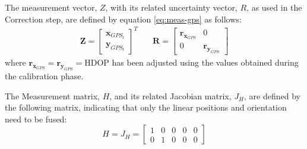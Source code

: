 The measurement vector, $Z$, with its related uncertainty vector, $R$, as used in the Correction step, are defined by equation \eqref{eq:meas-gps} as follows:  
\begin{align}
\label{eq:meas-gps}
\mathbf{Z}
=
\begin{bmatrix}
\mathbf{x}_{GPS_t} \\
\mathbf{y}_{GPS_t}
\end{bmatrix}^T
& \quad
\mathbf{R}
=
\begin{bmatrix}
\mathbf{r}_{\mathbf{x}_{GPS}} & 0 \\
0 & \mathbf{r}_{\mathbf{y}_{GPS}} 
\end{bmatrix}
\end{align}
where $\mathbf{r}_{\mathbf{x}_{GPS}} = \mathbf{r}_{\mathbf{y}_{GPS}} = \text{HDOP} $ has been adjusted using the values obtained during the calibration phase.

The Measurement matrix, $H$, and its related Jacobian matrix, $J_H$, are defined by the following matrix, indicating that only the linear positions and orientation need to be fused:
\begin{equation}
H = J_H =
\begin{bmatrix}
1 & 0 & 0 & 0 & 0 \\
0 & 1 & 0 & 0 & 0 
\end{bmatrix}
\end{equation}


